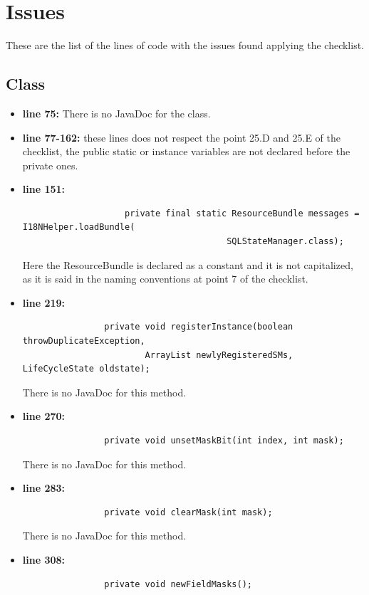 \documentclass[18pt,oneside,a4paper, titlepage]{article}
\begin{document}
\newpage
\section{Issues}
	These are the list of the lines of code with the issues found applying the checklist.
		\subsection{Class}
			\begin{itemize}
				\item \textbf{line 75:} There is no JavaDoc for the class.
				\item \textbf{line 77-162:} these lines does not respect the point 25.D and 25.E of the checklist, the public static or instance variables are not declared before the private ones.
				\item \textbf{line 151:} \begin{lstlisting}
					private final static ResourceBundle messages = I18NHelper.loadBundle(
										SQLStateManager.class);
					\end{lstlisting}
				\vspace{0.1cm}
				Here the ResourceBundle is declared as a constant and it is not capitalized, as it is said in the naming conventions at point 7 of the checklist.
				\item \textbf{line 219:} \begin{lstlisting}
				private void registerInstance(boolean throwDuplicateException,
						ArrayList newlyRegisteredSMs, LifeCycleState oldstate);
				\end{lstlisting}
				\vspace{0.1cm}
				There is no JavaDoc for this method.
				\item \textbf{line 270:} 
				\begin{lstlisting}
				private void unsetMaskBit(int index, int mask);
				\end{lstlisting}
				\vspace{0.1cm}
				There is no JavaDoc for this method.
				\item \textbf{line 283:}
				\begin{lstlisting}
				private void clearMask(int mask);
				\end{lstlisting}
				\vspace{0.1cm}
				There is no JavaDoc for this method.
				\item \textbf{line 308:} \begin{lstlisting}
				private void newFieldMasks();

\end{lstlisting}
\end{itemize}
\end{document}
